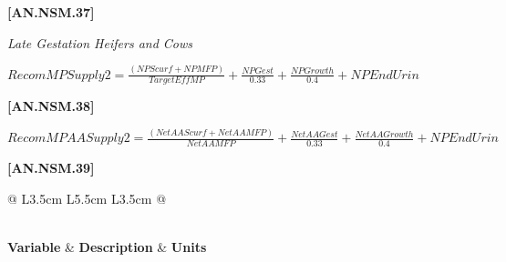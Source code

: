 \documentclass{article}
\begin{document}
\begin{refsection}
\begin{itemize}
\vspace{0.5cm}
            {\raggedleft \textbf{[AN.NSM.37]}\par}
            \vspace{0.5cm}
            
\textit{\small Late Gestation Heifers and Cows}
\vspace{0.2cm}

    \begin{center}
    \(RecomMPSupply2 =  \frac{(NPScurf + NPMFP)}{TargetEffMP} + \frac{NPGest}{0.33} + \frac{NPGrowth}{0.4} + NPEndUrin\)
    \end{center}

\vspace{0.5cm}
            {\raggedleft \textbf{[AN.NSM.38]}\par}
            \vspace{0.5cm}

    \begin{center}
    \(RecomMPAASupply2 =  \frac{(NetAAScurf + NetAAMFP)}{NetAAMFP} + \frac{NetAAGest}{0.33} + \frac{NetAAGrowth}{0.4} + NPEndUrin\)
    \end{center}

\vspace{0.5cm}
            {\raggedleft \textbf{[AN.NSM.39]}\par}
            \vspace{0.5cm}



\renewcommand{\arraystretch}{1.3}
\begin{longtable}{@{} L{3.5cm} L{5.5cm} L{3.5cm} @{}}
\caption{Key variables used in protein requirement calculations.} \label{nasemproteinkey} \\
\toprule
\textbf{Variable} & \textbf{Description} & \textbf{Units} \\
\midrule
\endfirsthead

 \\
\endfoot



\end{longtable}
\end{itemize}
\end{refsection}
\end{document}
